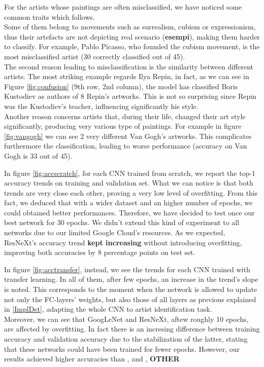 \documentclass{article}
\begin{document}
For the artists whose paintings are often misclassified, we have noticed some common traits which follows.\\
Some of them belong to movements such as surrealism, cubism or expressionism, thus their artefacts are not depicting real scenario (\textbf{esempi}), making them harder to classify.
For example, Pablo Picasso, who founded the cubism movement, is the most misclassified artist (30 correctly classified out of 45).\\
The second reason leading to misclassification is the similarity  between different artists. The most striking example regards Ilya Repin, in fact, as we can see in Figure \ref{fig:confusion} (9th row, 2nd column), the model has classified Boris Kustodiev as authors of 8 Repin's artworks. This is not so surprising since Repin was the Kustodiev's teacher, influencing significantly his style. \\
Another reason concerns artists that, during their life, changed their art style significantly, producing very various type of paintings. For example in figure \ref{fig:vangogh} we can see 2 very different Van Gogh's artworks. This complicates furthermore the classification, leading to worse performance (accuracy on Van Gogh is 33 out of 45).

In figure \ref{fig:accscratch}, for each CNN trained from scratch,  we report the top-1 accuracy trends on training and validation set. What we can notice is that both trends are very close each other, proving a very low level of overfitting.
From this fact, we deduced that with a wider dataset and an higher number of epochs, we could obtained better performances. Therefore, we have decided to test once our best network for 30 epochs. We didn't extend this kind of experiment to all networks due to our limited Google Cloud's resources. As we expected, ResNeXt's accuracy trend \textbf{kept increasing} without introducing overfitting, improving both accuracies by 8 percentage points on test set.

In figure \ref{fig:acctransfer}, instead, we see the trends for each CNN trained with transfer learning. In all of them, after few epochs, an increase in the trend's slope is noted. This corresponds to the moment when the network is allowed to update not only the FC-layers' weights, but also those of all layers as previous explained in \ref{ImplDet}, adapting the whole CNN to artist identification task.\\
Moreover, we can see that GoogLeNet and ResNeXt, aftew roughly 10 epochs, are affected by overfitting. In fact there is an incresing difference between training accuracy and validation accuracy due to the stabilization of the latter, stating that these networks could have been trained for fewer epochs.  However, our results achieved higher accuracies than \cite{ArtistIdCNN406}, \cite{Saleh2015} and \cite{mensink2014}, \textbf{OTHER}
\end{document}
